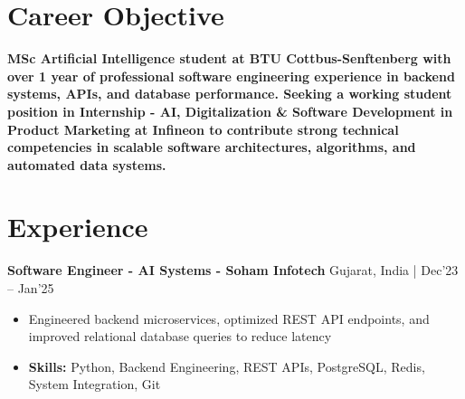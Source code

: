 \documentclass[a4paper,11pt]{article}
\begin{document}
\vspace{-7mm}

\section{\textbf{Career Objective}}
\vspace{1mm}

\textbf{MSc Artificial Intelligence student at BTU Cottbus-Senftenberg with over 1 year of professional software engineering experience in backend systems, APIs, and database performance. Seeking a working student position in Internship - AI, Digitalization \& Software Development in Product Marketing at Infineon to contribute strong technical competencies in scalable software architectures, algorithms, and automated data systems.}
\section{\textbf{Experience}}


\vspace{1mm}
  \textbf{Software Engineer - AI Systems - Soham Infotech} \hfill Gujarat, India | Dec'23 -- Jan'25
\vspace{-1.5mm} %
\begin{itemize}
  \item Engineered backend microservices, optimized REST API endpoints, and improved relational database queries to reduce latency


\vspace{-2mm}
  \item \textbf{Skills:} Python, Backend Engineering, REST APIs, PostgreSQL, Redis, System Integration, Git
\end{itemize}
\end{document}
